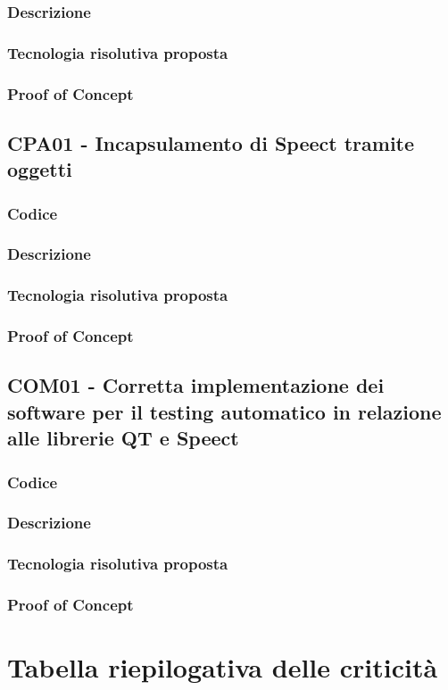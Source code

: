 \documentclass[./../Technology Baseline.tex]{subfiles}
\begin{document}
\subsubsection{Descrizione}

\subsubsection{Tecnologia risolutiva proposta}

\subsubsection{Proof of Concept}

\subsection{CPA01 - Incapsulamento di Speect tramite oggetti}

\subsubsection{Codice}

\subsubsection{Descrizione}

\subsubsection{Tecnologia risolutiva proposta}

\subsubsection{Proof of Concept}

\subsection{COM01 - Corretta implementazione dei software per il testing automatico in relazione alle librerie QT e Speect}

\subsubsection{Codice}

\subsubsection{Descrizione}

\subsubsection{Tecnologia risolutiva proposta}

\subsubsection{Proof of Concept}

\section{Tabella riepilogativa delle criticità}
\end{document}
